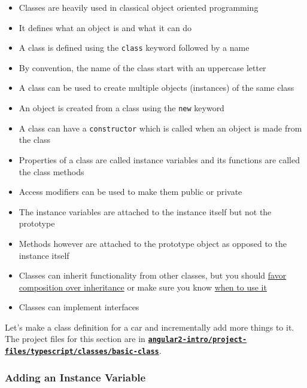 \documentclass[12pt,]{article}
\providecommand{\tightlist}{%
  \setlength{\itemsep}{0pt}\setlength{\parskip}{0pt}}
\begin{document}
\begin{itemize}
\tightlist
\item
  Classes are heavily used in classical object oriented programming
\item
  It defines what an object is and what it can do
\item
  A class is defined using the \texttt{class} keyword followed by a name
\item
  By convention, the name of the class start with an uppercase letter
\item
  A class can be used to create multiple objects (instances) of the same
  class
\item
  An object is created from a class using the \texttt{new} keyword
\item
  A class can have a \texttt{constructor} which is called when an object
  is made from the class
\item
  Properties of a class are called instance variables and its functions
  are called the class methods
\item
  Access modifiers can be used to make them public or private
\item
  The instance variables are attached to the instance itself but not the
  prototype
\item
  Methods however are attached to the prototype object as opposed to the
  instance itself
\item
  Classes can inherit functionality from other classes, but you should
  \href{https://medium.com/javascript-scene/the-two-pillars-of-javascript-ee6f3281e7f3\#.oc5pdevwh}{favor
  composition over inheritance} or make sure you know
  \href{https://medium.com/@dtinth/es6-class-classical-inheritance-20f4726f4c4\#.xdif2m42e}{when
  to use it}
\item
  Classes can implement interfaces
\end{itemize}

Let's make a class definition for a car and incrementally add more
things to it. The project files for this section are in
\href{https://github.com/aminmeyghani/angular2-intro/tree/master/project-files/typescript/classes/basic-class}{\textbf{\texttt{angular2-intro/project-files/typescript/classes/basic-class}}}.

\subsubsection{Adding an Instance
Variable}\label{adding-an-instance-variable}
\end{document}
